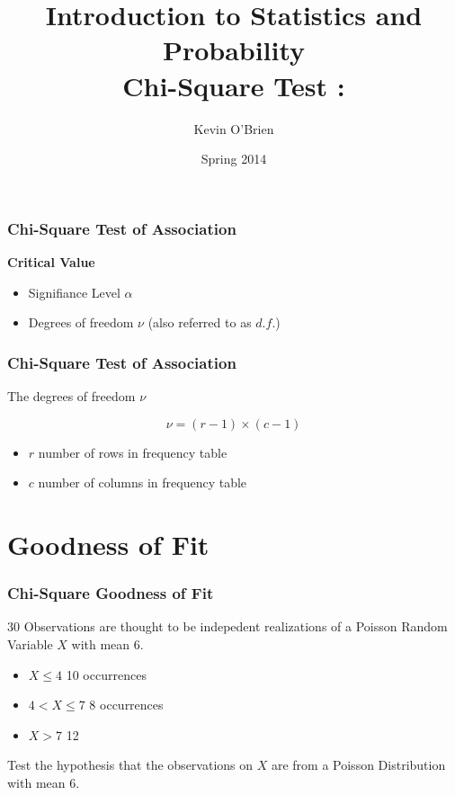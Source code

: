 \documentclass[a4]{beamer}
\title[Stats-Lab.com]{\LARGE Introduction to Statistics and Probability \\ {\Large Chi-Square Test : }}
\author[Kevin O'Brien]{Kevin O'Brien}
\date{Spring 2014}
\begin{document}
\begin{frame}
\titlepage
\end{frame}
\begin{frame}
\frametitle{Chi-Square Test of Association}

\Large
\textbf{Critical Value}

\begin{itemize}
\item Signifiance Level $\alpha$
\item Degrees of freedom $\nu$ (also referred to as $d.f.$)
\end{itemize}

\end{frame}
\begin{frame}
\frametitle{Chi-Square Test of Association}
\Large
\vspace{-1cm}
The degrees of freedom $\nu$

\[ \nu  = (r-1) \times (c-1) \]


\begin{itemize}
\item $r$ number of rows in frequency table
\item $c$ number of columns in frequency table
\end{itemize}

\end{frame}

\section{Goodness of Fit}
\begin{frame}
\frametitle{Chi-Square Goodness of Fit}
\Large
\vspace{-1cm}
30 Observations are thought to be indepedent realizations of a Poisson Random Variable $X$ with mean 6.

\begin{itemize}
\item $X \leq 4$ 10 occurrences
\item $4 < X \leq 7$ 8 occurrences
\item $ X >7$ 12
\end{itemize}
Test the hypothesis that the observations on $X$ are from a Poisson Distribution with mean 6.
\end{frame}
\end{document}
